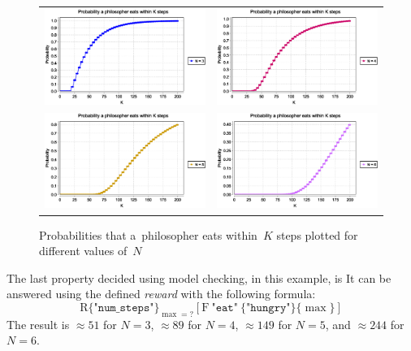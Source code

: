 \documentclass[a4paper, 11pt]{article}
\theoremstyle{definition}
\begin{document}
\begin{figure}[hbt]
    \centering

    \begin{tabular}{cc}
        \includegraphics[width=.45 \linewidth]{case-stud-3.eps}
        & \includegraphics[width=.45 \linewidth]{case-stud-4.eps} \\
        \includegraphics[width=.45 \linewidth]{case-stud-5.eps}
        & \includegraphics[width=.45 \linewidth]{case-stud-6.eps}
    \end{tabular}

    \caption{%
        Probabilities that a~philosopher eats within~$ K $ steps
        plotted for different values of~$ N $%
    }
    \label{fig:caseStudExp2}
\end{figure}

The last property decided using model checking, in this example, is
 It can be
answered using the defined \emph{reward} with the following formula:
$$
    \mathrm{R}\{\texttt{"num\_steps"}\}_{\max = ?}
    [\mathrm{F}\ \texttt{"eat"}\ \{\texttt{"hungry"}\}\{\max\}]
$$
The result is $ \approx 51 $ for $ N = 3 $, $ \approx 89 $ for $ N = 4 $,
$ \approx 149 $ for $ N = 5 $, and $ \approx 244 $ for $ N = 6 $.
\end{document}
